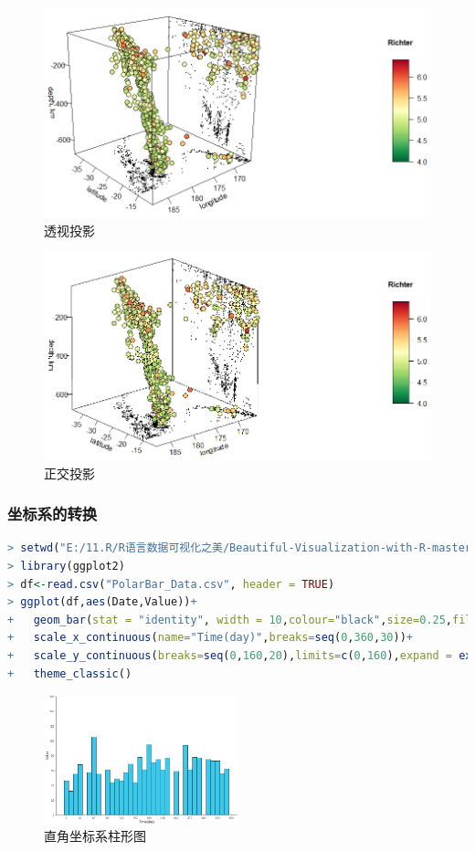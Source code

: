 \documentclass[11pt,a4paper,oneside]{book}
\begin{document}
\begin{figure}[H]
	\centering
	\includegraphics[width=\textwidth]{screenshot035}
	\caption{透视投影}
	\label{fig:screenshot035}
\end{figure}
\begin{figure}[H]
	\centering
	\includegraphics[width=\textwidth]{screenshot036}
	\caption{正交投影}
	\label{fig:screenshot036}
\end{figure}

\subsubsection{坐标系的转换}
\begin{lstlisting}[language=r]
> setwd("E:/11.R/R语言数据可视化之美/Beautiful-Visualization-with-R-master/第1章 R语言编程与绘图基础")
> library(ggplot2)
> df<-read.csv("PolarBar_Data.csv", header = TRUE)
> ggplot(df,aes(Date,Value))+
+   geom_bar(stat = "identity", width = 10,colour="black",size=0.25,fill="#3BC8EB")+ #离散柱形图
+   scale_x_continuous(name="Time(day)",breaks=seq(0,360,30))+
+   scale_y_continuous(breaks=seq(0,160,20),limits=c(0,160),expand = expand_scale(add = 0))+
+   theme_classic()
\end{lstlisting}
\begin{figure}[H]
	\centering
	\includegraphics[width=0.5\textwidth]{screenshot037}
	\caption{直角坐标系柱形图}
	\label{fig:screenshot037}
\end{figure}
\end{document}

